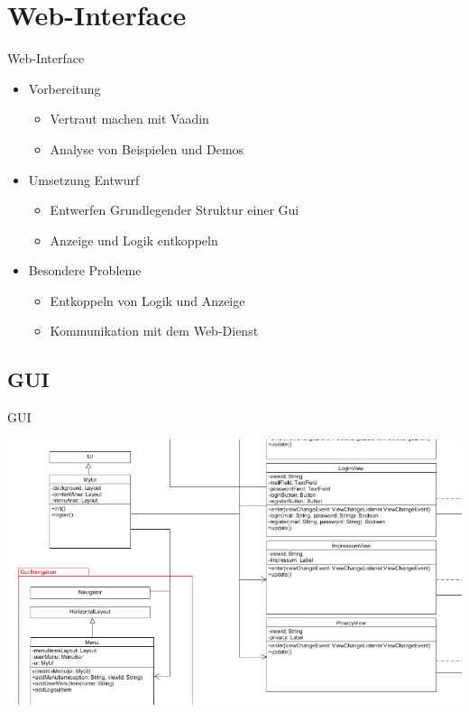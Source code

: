 \documentclass[19pt]{beamer}
\begin{document}


\section{Web-Interface}
\begin{frame}{Web-Interface}
    \begin{itemize}
    	\item Vorbereitung
    	\begin{itemize}
			\item Vertraut machen mit Vaadin
			\pause
			\item Analyse von Beispielen und Demos
			\pause
		\end{itemize}
		\item Umsetzung Entwurf
		\begin{itemize}
			\item Entwerfen Grundlegender Struktur einer Gui
			\pause
			\item Anzeige und Logik entkoppeln
			\pause
		\end{itemize}
    	\item Besondere Probleme
    	\begin{itemize}
			\item Entkoppeln von Logik und Anzeige
			\pause
			\item Kommunikation mit dem Web-Dienst
		\end{itemize}
    \end{itemize}
\end{frame}
\subsection{GUI}
\begin{frame}{GUI}
\begin{center}
\includegraphics[scale=0.35]{resources/interface_gui.png}
\end{center}
\end{frame}
\end{document}
